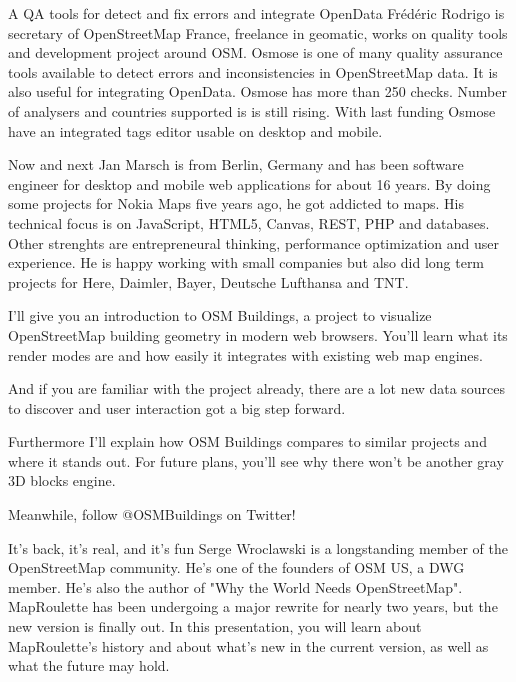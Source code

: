 %
{A QA tools for detect and fix errors and integrate OpenData}%
{Frédéric Rodrigo is secretary of OpenStreetMap France, freelance in geomatic, works on quality tools and development project around OSM.}%
{Osmose is one of many quality assurance tools available to detect errors and inconsistencies in OpenStreetMap data. It is also useful for integrating OpenData. Osmose has more than 250 checks. Number of analysers and countries supported is is still rising. With last funding Osmose have an integrated tags editor usable on desktop and mobile.}

%
{Now and next}%
{Jan Marsch is from Berlin, Germany and has been software engineer for desktop and mobile web applications for about 16 years. By doing some projects for Nokia Maps five years ago, he got addicted to maps. His technical focus is on JavaScript, HTML5, Canvas, REST, PHP and databases. Other strenghts are entrepreneural thinking, performance optimization and user experience. He is happy working with small companies but also did long term projects for Here, Daimler, Bayer, Deutsche Lufthansa and TNT.}%
{I'll give you an introduction to OSM Buildings, a project to visualize OpenStreetMap building geometry in modern web browsers.
You'll learn what its render modes are and how easily it integrates with existing web map engines.

And if you are familiar with the project already, there are a lot new data sources to discover and user interaction got a big step forward.

Furthermore I’ll explain how OSM Buildings compares to similar projects and where it stands out. For future plans, you'll see why there won't be another gray 3D blocks engine.

Meanwhile, follow @OSMBuildings on Twitter!}


%
{It's back, it's real, and it's fun}%
{Serge Wroclawski is a longstanding member of the OpenStreetMap community. He's one of the founders of OSM US, a DWG member. He's also the author of "Why the World Needs OpenStreetMap".}%
{MapRoulette has been undergoing a major rewrite for nearly two years, but the new version is finally out. In this presentation, you will learn about MapRoulette's history and about what's new in the current version, as well as what the future may hold.}

